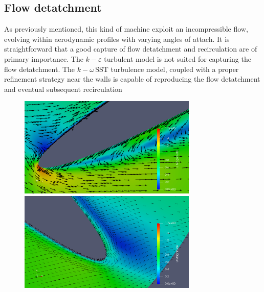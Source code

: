 \documentclass[a4paper,12pt]{article}
\newcommand{\todo}{\colorbox{cyan!60}{TODO}}
\newcommand{\kepsilon}{$k\!-\!\varepsilon $ }
\newcommand{\komegasst}{$k\!-\!\omega \, \text{SST} $ }
\begin{document}

\subsection{Flow detatchment}

As previously mentioned, this kind of machine exploit an incompressible flow, evolving within aerodynamic profiles with varying angles of attach.
It is straightforward that a good capture of flow detatchment and recirculation are of primary importance.
The \kepsilon turbulent model is not suited for capturing the flow detatchment.
The \komegasst turbulence model, coupled with a proper refinement strategy near the walls is capable of reproducing the flow detatchment and eventual subsequent recirculation
\begin{figure}
\includegraphics[width=8.5cm]{images/turbulence/recirculation_scalarScaled.png}
\includegraphics[width=8.5cm]{images/turbulence/recirculation_scalarScaledGOODresolution.png}  
\end{figure}
\end{document}
